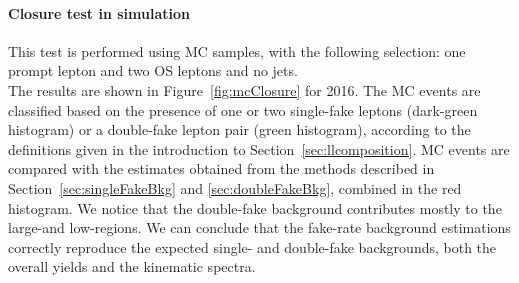 \paragraph{Closure test in simulation}
This test is performed using \ttbar MC samples, with the
following selection: one prompt lepton and two OS \displ leptons and no \PQb jets.\\
The results are shown in Figure~\ref{fig:mcClosure} for 2016. The MC
events are 
classified based on the presence of one or two single-fake leptons
(dark-green histogram) or a double-fake lepton pair (green histogram),
according to the definitions given in the introduction to
Section~\ref{sec:llcomposition}. MC events are compared with the estimates
obtained from the \fr methods described in
Section~\ref{sec:singleFakeBkg}
and \ref{sec:doubleFakeBkg}, combined in the red histogram.
We notice that the double-fake background contributes mostly to
the large-\Deltwod and low-\mtwol regions. We can conclude that the
fake-rate background estimations correctly reproduce the expected
single- and double-fake backgrounds, both the overall yields and the
kinematic spectra.
